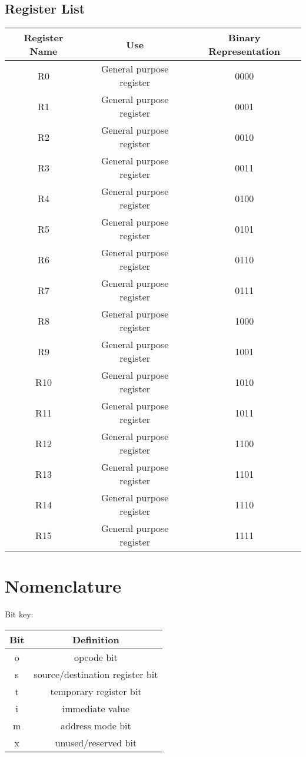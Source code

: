 \documentclass[a4paper]{article}
\begin{document}
\subsection{Register List}
\begin{center}
\begin{tabular}{| c | c | c |}
\hline
Register Name & Use & Binary Representation\\ \hline
R0 & General purpose register & 0000\\ \hline
R1 & General purpose register & 0001\\ \hline
R2 & General purpose register & 0010\\ \hline
R3 & General purpose register & 0011\\ \hline
R4 & General purpose register & 0100\\ \hline
R5 & General purpose register & 0101\\ \hline
R6 & General purpose register & 0110\\ \hline
R7 & General purpose register & 0111\\ \hline
R8 & General purpose register & 1000\\ \hline
R9 & General purpose register & 1001\\ \hline
R10 & General purpose register& 1010\\ \hline
R11 & General purpose register& 1011\\ \hline
R12 & General purpose register& 1100\\ \hline
R13 & General purpose register& 1101\\ \hline
R14 & General purpose register& 1110\\ \hline
R15 & General purpose register& 1111\\ \hline
\end{tabular}
\end{center}

\section{Nomenclature}
Bit key:
\begin{center}
\begin{tabular}{| c | c |}
\hline
Bit & Definition\\ \hline
o & opcode bit\\ \hline
s & source/destination register bit \\ \hline
t & temporary register bit\\ \hline
i & immediate value\\ \hline
m & address mode bit\\ \hline
x & unused/reserved bit \\ \hline
\end{tabular}
\end{center}
\end{document}
